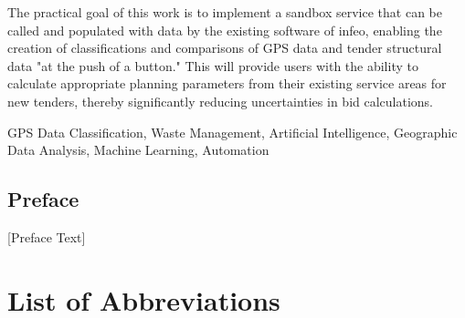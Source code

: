 \documentclass[a4paper,12pt,twoside]{scrreprt}
\begin{document}
The practical goal of this work is to implement a sandbox service that can be called and populated with data by the existing software of infeo, enabling the creation of classifications and comparisons of GPS data and tender structural data "at the push of a button." This will provide users with the ability to calculate appropriate planning parameters from their existing service areas for new tenders, thereby significantly reducing uncertainties in bid calculations.
\vspace{0.5cm}

\noindent
GPS Data Classification, Waste Management, Artificial Intelligence, Geographic Data Analysis, Machine Learning, Automation

\newpage
\section*{Preface}   %

[Preface Text]


\cleardoublepage   %
\tableofcontents

\clearpage
{}
{}
\listoffigures

\clearpage
{}
{}
\listoftables

\clearpage
{}
{}  %
\chapter*{List of Abbreviations} %
\begin{acronym}[GPS]
\end{acronym}
\end{document}
